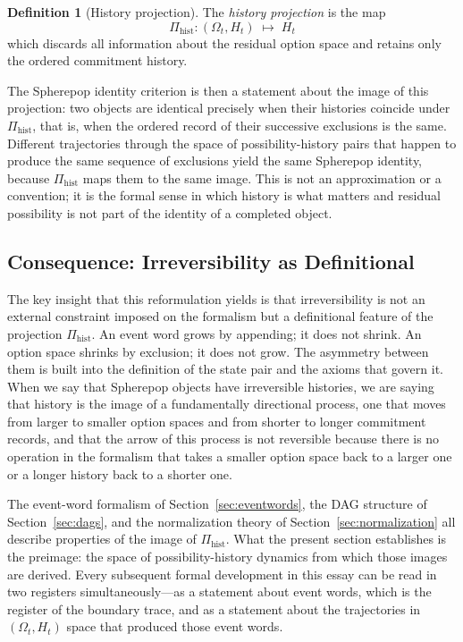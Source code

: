 \documentclass[12pt]{article}
\theoremstyle{plain}
\theoremstyle{definition}
\newtheorem{definition}[theorem]{Definition}
\theoremstyle{remark}
\begin{document}
\begin{definition}[History projection]
\label{def:hist-proj}
The \emph{history projection} is the map
\[
  \Pi_{\mathrm{hist}} : (\Omega_t, H_t) \;\longmapsto\; H_t
\]
which discards all information about the residual option space and retains
only the ordered commitment history.
\end{definition}

The Spherepop identity criterion is then a statement about the image of this
projection: two objects are identical precisely when their histories coincide
under $\Pi_{\mathrm{hist}}$, that is, when the ordered record of their
successive exclusions is the same.  Different trajectories through the space
of possibility-history pairs that happen to produce the same sequence of
exclusions yield the same Spherepop identity, because $\Pi_{\mathrm{hist}}$
maps them to the same image.  This is not an approximation or a convention;
it is the formal sense in which history is what matters and residual
possibility is not part of the identity of a completed object.

\subsection{Consequence: Irreversibility as Definitional}

The key insight that this reformulation yields is that irreversibility is not
an external constraint imposed on the formalism but a definitional feature of
the projection $\Pi_{\mathrm{hist}}$.  An event word grows by appending; it
does not shrink.  An option space shrinks by exclusion; it does not grow.
The asymmetry between them is built into the definition of the state pair and
the axioms that govern it.  When we say that Spherepop objects have irreversible
histories, we are saying that history is the image of a fundamentally directional
process, one that moves from larger to smaller option spaces and from shorter
to longer commitment records, and that the arrow of this process is not
reversible because there is no operation in the formalism that takes a smaller
option space back to a larger one or a longer history back to a shorter one.

The event-word formalism of Section~\ref{sec:eventwords}, the DAG structure of
Section~\ref{sec:dags}, and the normalization theory of
Section~\ref{sec:normalization} all describe properties of the image of
$\Pi_{\mathrm{hist}}$.  What the present section establishes is the preimage:
the space of possibility-history dynamics from which those images are derived.
Every subsequent formal development in this essay can be read in two registers
simultaneously---as a statement about event words, which is the register of the
boundary trace, and as a statement about the trajectories in $(\Omega_t, H_t)$
space that produced those event words.
\end{document}
